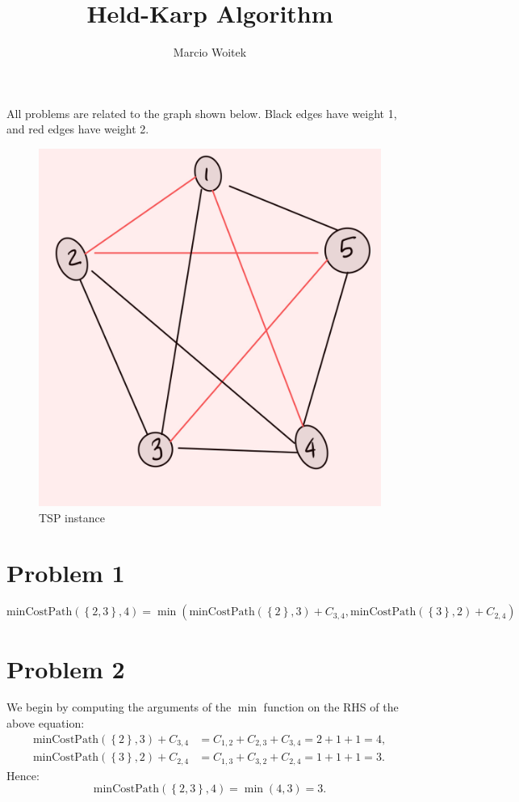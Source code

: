 \documentclass[11pt]{article}
\author{Marcio Woitek}
\date{}
\title{Held-Karp Algorithm}
\newcommand{\minCostPath}[2]{\mathrm{minCostPath}\left(\left\{#1\right\},#2\right)}
\begin{document}
\maketitle
\thispagestyle{empty}
\pagestyle{empty}

All problems are related to the graph shown below. Black edges have weight 1,
and red edges have weight 2.
\begin{figure}[h]
  \centering
  \includegraphics[scale=0.25]{held_karp_graph.jpeg}
  \caption{TSP instance}
\end{figure}

\section*{Problem 1}
\label{sec:orgae58da4}
\begin{equation}
\minCostPath{2,3}{4}=\min\left(\minCostPath{2}{3}+C_{3,4},\minCostPath{3}{2}+C_{2,4}\right)
\end{equation}

\section*{Problem 2}
\label{sec:org6bf1af5}
We begin by computing the arguments of the \(\min\) function on the RHS of the above equation:
\begin{align*}
\minCostPath{2}{3}+C_{3,4}&=C_{1,2}+C_{2,3}+C_{3,4}=2+1+1=4,\\
\minCostPath{3}{2}+C_{2,4}&=C_{1,3}+C_{3,2}+C_{2,4}=1+1+1=3.
\end{align*}
Hence:
\begin{equation}
\minCostPath{2,3}{4}=\min(4,3)=3.
\end{equation}
\end{document}
